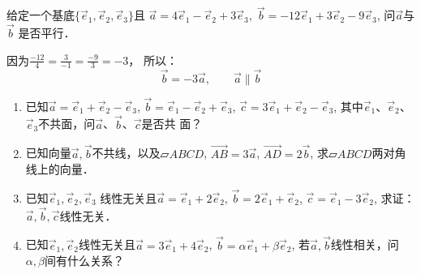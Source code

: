 \begin{example}
    给定一个基底$\{\vec{e}_1,\vec{e}_2,\vec{e}_3\}$且
$\vec{a}=4\vec{e}_1-\vec{e}_2+3\vec{e}_3,\; \vec{b}=-12\vec{e}_1+3\vec{e}_2-9\vec{e}_3$, 问$\vec{a}$与$\vec{b}$
是否平行．
\end{example}

\begin{solution}
因为$\frac{-12}{4}=\frac{3}{-1}=\frac{-9}{3}=-3$，
所以：
\[\vec{b}=-3\vec{a},\qquad \vec{a}\parallel \vec{b}\]    
\end{solution}

\begin{ex}
\begin{enumerate}
    \item 已知$\vec{a}=\vec{e}_1+\vec{e}_2-\vec{e}_3$, $\vec{b}=\vec{e}_1-\vec{e}_2+\vec{e}_3$, $\vec{c} =3\vec{e}_1+\vec{e}_2-\vec{e}_3$, 其中$\vec{e}_1$、$\vec{e}_2$、$\vec{e}_3$不共面，问$\vec{a}$、$\vec{b}$、$\vec{c}$是否共
    面？
    \item     已知向量$\vec{a},\vec{b}$不共线，以及$\parallelogram ABCD$, $\Vec{AB}=3\vec{a}$, $\Vec{AD}=2\vec{b}$, 求$\parallelogram ABCD$两对角线上的向量．
  \item 已知$\vec{e}_1,\vec{e}_2,\vec{e}_3$
    线性无关且$\vec{a}=\vec{e}_1+2\vec{e}_2$, $\vec{b}=2\vec{e}_1+\vec{e}_2$,
    $\vec{c}=\vec{e}_1-3\vec{e}_2$, 求证：$\vec{a},\vec{b},\vec{c}$线性无关．
    \item  已知$\vec{e}_1,\vec{e}_2$线性无关且$\vec{a}=3\vec{e}_1+4\vec{e}_2$, $\vec{b}=\alpha\vec{e}_1+\beta \vec{e}_2$, 若$\vec{a}, \vec{b}$线性相关，问$\alpha,\beta$间有什么关系？
    

\end{enumerate}
\end{ex}
